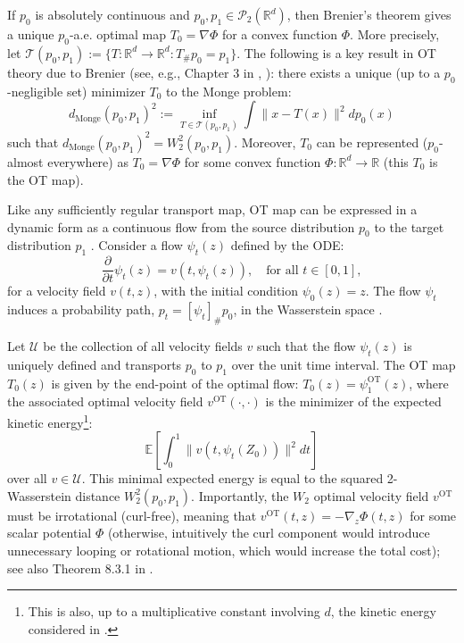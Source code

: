 \documentclass[a4paper,11pt]{article}
\newcommand{\R}{\mathbb{R}}
\theoremstyle{plain}
\theoremstyle{definition}
\begin{document}
If \(p_0\) is absolutely continuous and \(p_0,p_1\in\mathcal P_2(\mathbb R^d)\), then Brenier's theorem gives a unique \(p_0\)-a.e. optimal map \(T_0=\nabla\Phi\) for a convex function \(\Phi\). More precisely, 
let $\mathcal{T}(p_0, p_1) := \{T: \R^d \to \R^d : T_{\#} p_0 = p_1\}$. The following is a key result in OT theory due to Brenier (see, e.g.,  Chapter 3 in \cite{villani2021topics}, \cite{manole2024plugin}): there exists a unique (up to a $p_0$-negligible set)  minimizer $T_0$ to the Monge problem:
    $$d_{\mathrm{Monge}}(p_0, p_1)^2 := \inf_{T \in \mathcal{T}(p_0, p_1)} \int \|x - T(x)\|^2 dp_0(x) $$
such that $d_{\mathrm{Monge}}(p_0, p_1)^2 = W_2^2(p_0, p_1)$. Moreover, $T_0$ can be represented ($p_0$-almost everywhere) as $T_0 = \nabla \Phi$ for some convex function $\Phi: \R^d \to \R$ (this $T_0$ is  the OT map).


 Like any sufficiently regular transport map, OT map can be expressed in a dynamic form as a continuous flow from the source distribution $p_0$ to the target distribution $p_1$ \cite{benamou2000computational, chen2021stochastic}. Consider a flow $\psi_t(z)$ defined by the ODE:
$$\frac{\partial}{\partial t} \psi_t(z) = v(t, \psi_t(z)), \quad \text{for all } t \in [0, 1],$$
for a velocity field $v(t, z)$, with the initial condition $\psi_0(z) = z$. The flow $\psi_t$  induces a probability path, $p_t = [\psi_t]_{\#} p_0$, in the Wasserstein space \cite{wald2025flow}.

Let $\mathcal{U}$ be the collection of all velocity fields $v$ such that the flow $\psi_t(z)$ is uniquely defined and transports $p_0$ to $p_1$ over the unit time interval. The OT  map $T_0(z)$ is given by the end-point of the optimal flow: $T_0(z) = \psi_1^{\text{OT}}(z)$, where the associated optimal velocity field $v^{\text{OT}}(\cdot, \cdot)$ is the minimizer of the expected kinetic energy\footnote{This is also, up to a multiplicative constant involving $d$, the kinetic energy considered in \cite{shaul2023kinetic}.}:
$$\mathbb{E} \left[ \int_0^1 \|v(t, \psi_t(Z_0))\|^2 dt \right]$$
over all $v \in \mathcal{U}$. This minimal expected energy is equal to the squared 2-Wasserstein distance $W_2^2(p_0, p_1)$. Importantly,  the $W_2$ optimal velocity field $v^{\text{OT}}$ must be irrotational (curl-free), meaning that $v^{\text{OT}}(t, z) = -\nabla_z  \Phi(t, z)$ for some scalar potential $\Phi$ (otherwise, intuitively the curl component would introduce unnecessary looping or rotational motion, which would increase the total cost); see also Theorem 8.3.1 in \cite{ambrosio2005gradient}. 
\end{document}
